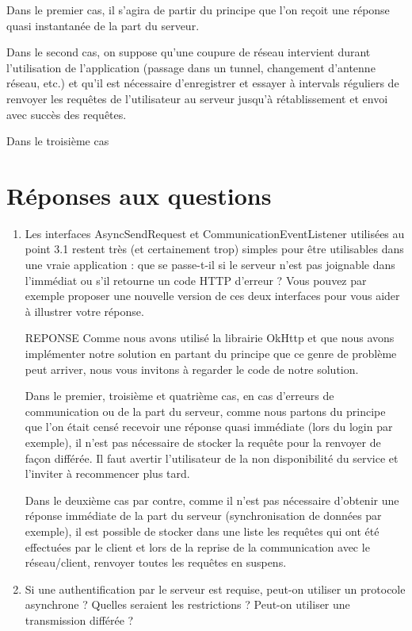 \documentclass[a4paper]{article}
\begin{document}
Dans le premier cas, il s'agira de partir du principe que l'on reçoit une réponse quasi instantanée de la part du serveur.

Dans le second cas, on suppose qu'une coupure de réseau intervient durant l'utilisation de l'application (passage dans un tunnel, changement d'antenne réseau, etc.) et qu'il est nécessaire d'enregistrer et essayer à intervals réguliers de renvoyer les requêtes de l'utilisateur au serveur jusqu'à rétablissement et envoi avec succès des requêtes.

Dans le troisième cas 

\section{Réponses aux questions}

\begin{enumerate}
	\item Les interfaces AsyncSendRequest et CommunicationEventListener utilisées au point 3.1 restent très (et certainement trop) simples pour être utilisables dans une vraie application : que se passe-t-il si le serveur n’est pas joignable dans l’immédiat ou s’il retourne un code HTTP d’erreur ? Vous pouvez par exemple proposer une nouvelle version de ces deux interfaces pour vous aider à illustrer votre réponse.
    
    REPONSE
    Comme nous avons utilisé la librairie OkHttp et que nous avons implémenter notre solution en partant du principe que ce genre de problème peut arriver, nous vous invitons à regarder le code de notre solution.
    
    Dans le premier, troisième et quatrième cas, en cas d'erreurs de communication ou de la part du serveur, comme nous partons du principe que l'on était censé recevoir une réponse quasi immédiate (lors du login par exemple), il n'est pas nécessaire de stocker la requête pour la renvoyer de façon différée. Il faut avertir l'utilisateur de la non disponibilité du service et l'inviter à recommencer plus tard.
    
    Dans le deuxième cas par contre, comme il n'est pas nécessaire d'obtenir une réponse immédiate de la part du serveur (synchronisation de données par exemple), il est possible de stocker dans une liste les requêtes qui ont été effectuées par le client et lors de la reprise de la communication avec le réseau/client, renvoyer toutes les requêtes en suspens.
	
    \item Si une authentification par le serveur est requise, peut-on utiliser un protocole asynchrone ? Quelles seraient les restrictions ? Peut-on utiliser une transmission différée ?
    

\end{enumerate}
\end{document}
